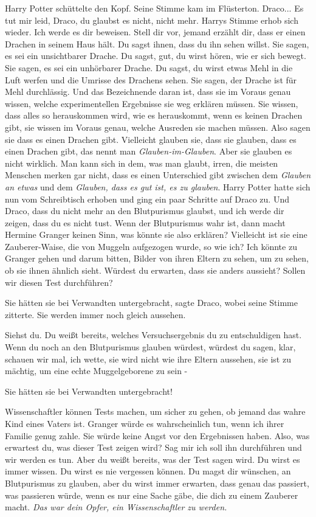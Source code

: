 Harry Potter schüttelte den Kopf. Seine Stimme kam im Flüsterton. \glqq Draco...
Es tut mir leid, Draco, du glaubst es nicht, nicht mehr.\grqq{} Harrys Stimme
erhob sich wieder. \glqq Ich werde es dir beweisen. Stell dir vor, jemand
erzählt dir, dass er einen Drachen in seinem Haus hält. Du sagst ihnen, dass du
ihn sehen willst. Sie sagen, es sei ein unsichtbarer Drache. Du sagst, gut, du
wirst hören, wie er sich bewegt. Sie sagen, es sei ein unhörbarer Drache. Du
sagst, du wirst etwas Mehl in die Luft werfen und die Umrisse des Drachens
sehen. Sie sagen, der Drache ist für Mehl durchlässig. Und das Bezeichnende
daran ist, dass sie im Voraus genau wissen, welche experimentellen Ergebnisse
sie weg erklären müssen. Sie wissen, dass alles so herauskommen wird, wie es
herauskommt, wenn es keinen Drachen gibt, sie wissen im Voraus genau, welche
Ausreden sie machen müssen. Also sagen sie dass es einen Drachen gibt.
Vielleicht glauben sie, dass sie glauben, dass es einen Drachen gibt, das nennt
man \emph{Glauben-im-Glauben}. Aber sie glauben es nicht wirklich. Man kann sich
in dem, was man glaubt, irren, die meisten Menschen merken gar nicht, dass es
einen Unterschied gibt zwischen dem \emph{Glauben an etwas} und dem
\emph{Glauben, dass es gut ist, es zu glauben}.\grqq{} Harry Potter hatte sich
nun vom Schreibtisch erhoben und ging ein paar Schritte auf Draco zu. \glqq Und
Draco, dass du nicht mehr an den Blutpurismus glaubst, und ich werde dir zeigen,
dass du es nicht tust. Wenn der Blutpurismus wahr ist, dann macht Hermine
Granger keinen Sinn, was könnte sie also erklären? Vielleicht ist sie eine
Zauberer-Waise, die von Muggeln aufgezogen wurde, so wie ich? Ich könnte zu
Granger gehen und darum bitten, Bilder von ihren Eltern zu sehen, um zu sehen,
ob sie ihnen ähnlich sieht. Würdest du erwarten, dass sie anders aussieht?
Sollen wir diesen Test durchführen?\grqq{}

\glqq Sie hätten sie bei Verwandten untergebracht\grqq{}, sagte Draco, wobei
seine Stimme zitterte. \glqq Sie werden immer noch gleich aussehen.\grqq{}

\glqq Siehst du. Du weißt bereits, welches Versuchsergebnis du zu entschuldigen
hast. Wenn du noch an den Blutpurismus glauben würdest, würdest du sagen, klar,
schauen wir mal, ich wette, sie wird nicht wie ihre Eltern aussehen, sie ist zu
mächtig, um eine echte Muggelgeborene zu sein -\grqq{}

\glqq Sie hätten sie bei Verwandten untergebracht!\grqq{}

\glqq Wissenschaftler können Tests machen, um sicher zu gehen, ob jemand das
wahre Kind eines Vaters ist. Granger würde es wahrscheinlich tun, wenn ich ihrer
Familie genug zahle. Sie würde keine Angst vor den Ergebnissen haben. Also, was
erwartest du, was dieser Test zeigen wird? Sag mir ich soll ihn durchführen und
wir werden es tun. Aber du weißt bereits, was der Test sagen wird. Du wirst es
immer wissen. Du wirst es nie vergessen können. Du magst dir wünschen, an
Blutpurismus zu glauben, aber du wirst immer erwarten, dass genau das passiert,
was passieren würde, wenn es nur eine Sache gäbe, die dich zu einem Zauberer
macht. \emph{Das war dein Opfer, ein Wissenschaftler zu werden.}\grqq{}

